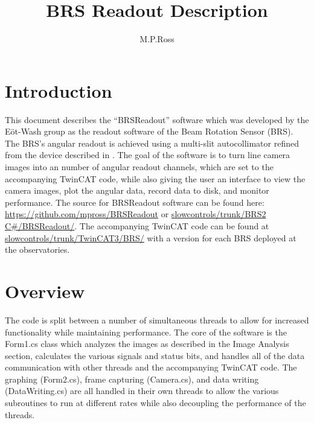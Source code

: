 \documentclass{article}
\title{BRS Readout Description}
\author{M.P.Ross}
\begin{document}
\maketitle
\section{Introduction}
This document describes the ``BRSReadout'' software which was developed by the E{\"o}t-Wash group as the readout software of the Beam Rotation Sensor (BRS). The BRS's angular readout is achieved using a multi-slit autocollimator refined from the device described in \cite{autoCol}. The goal of the software is to turn line camera images into an number of angular readout channels, which are set to the accompanying TwinCAT code, while also giving the user an interface to view the camera images, plot the angular data, record data to disk, and monitor performance. The source for BRSReadout software can be found here: \url{https://github.com/mpross/BRSReadout} or \url{slowcontrols/trunk/BRS2 C#/BRSReadout/}. The accompanying TwinCAT code can be found at \url{slowcontrols/trunk/TwinCAT3/BRS/} with a version for each BRS deployed at the observatories.

\section{Overview}
The code is split between a number of simultaneous threads to allow for increased functionality while maintaining performance. The core of the software is the Form1.cs class which analyzes the images as described in the Image Analysis section, calculates the various signals and status bits, and handles all of the data communication with other threads and the accompanying TwinCAT code. The graphing (Form2.cs), frame capturing (Camera.cs), and data writing (DataWriting.cs) are all handled in their own threads to allow the various subroutines to run at different rates while also decoupling the performance of the threads.
\end{document}
